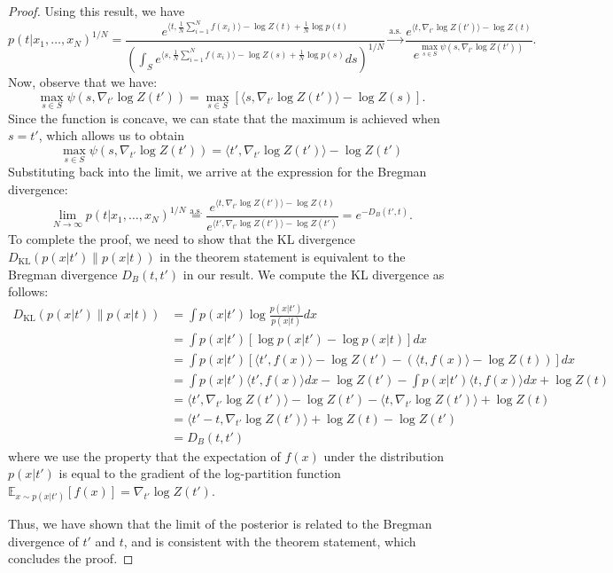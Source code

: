 \documentclass[10pt,a4paper]{amsart}
\begin{document}
\begin{proof}
Using this result, we have
\begin{equation}
p(t|x_1, \ldots, x_N)^{1/N} = \frac{e^{\langle t, \frac{1}{N} \sum_{i=1}^N f(x_i) \rangle - \log Z(t) + \frac{1}{N} \log p(t)}}{\left(\int_S e^{\langle s, \frac{1}{N} \sum_{i=1}^N f(x_i) \rangle - \log Z(s) + \frac{1}{N} \log p(s)} ds \right)^{1/N}} \xrightarrow{\text{a.s.}} \frac{e^{\langle t, \nabla_{t'} \log Z(t') \rangle - \log Z(t)}}{e^{\max_{s \in S} \psi(s, \nabla_{t'} \log Z(t'))}}.
\end{equation}
Now, observe that we have:
\begin{equation}
\max_{s \in S} \psi(s, \nabla_{t'} \log Z(t')) = \max_{s \in S} \left[ \langle s, \nabla_{t'} \log Z(t') \rangle - \log Z(s) \right].
\end{equation}
Since the function is concave, we can state that the maximum is achieved when $s=t'$, which allows us to obtain
\begin{equation}
\max_{s \in S} \psi(s, \nabla_{t'} \log Z(t')) = \langle t', \nabla_{t'} \log Z(t') \rangle - \log Z(t')
\end{equation}
Substituting back into the limit, we arrive at the expression for the Bregman divergence:
\begin{equation}
\lim_{N \to \infty} p(t|x_1, \ldots, x_N)^{1/N} \overset{\text{a.s.}}{=} \frac{e^{\langle t, \nabla_{t'} \log Z(t') \rangle - \log Z(t)}}{e^{\langle t', \nabla_{t'} \log Z(t') \rangle - \log Z(t')}} = e^{-D_{B}(t',t)}.
\end{equation}
To complete the proof, we need to show that the KL divergence $D_\text{KL}(p(x|t') \| p(x|t))$ in the theorem statement is equivalent to the Bregman divergence $D_B(t, t')$ in our result. We compute the KL divergence as follows:
\begin{align*}
    D_\text{KL}(p(x|t') \| p(x|t)) &= \int p(x|t') \log\frac{p(x|t')}{p(x|t)} dx \\
    &= \int p(x|t') [\log p(x|t') - \log p(x|t)] dx \\
    &= \int p(x|t') [\langle t', f(x) \rangle - \log Z(t') - (\langle t, f(x) \rangle - \log Z(t))] dx \\
    &= \int p(x|t') \langle t', f(x) \rangle dx - \log Z(t') - \int p(x|t') \langle t, f(x) \rangle dx + \log Z(t) \\
    &= \langle t', \nabla_{t'} \log Z(t') \rangle - \log Z(t') - \langle t, \nabla_{t'} \log Z(t') \rangle + \log Z(t) \\
    &= \langle t' - t, \nabla_{t'} \log Z(t') \rangle + \log Z(t) - \log Z(t') \\
    &= D_B(t, t')
\end{align*}
where we use the property that the expectation of $f(x)$ under the distribution $p(x|t')$ is equal to the gradient of the log-partition function $ \mathbb{E}_{x\sim p(x|t')}[f(x)] = \nabla_{t'} \log Z(t')$.

Thus, we have shown that the limit of the posterior is related to the Bregman divergence of $t'$ and $t$, and is consistent with the theorem statement, which concludes the proof.

\end{proof}
\end{document}
